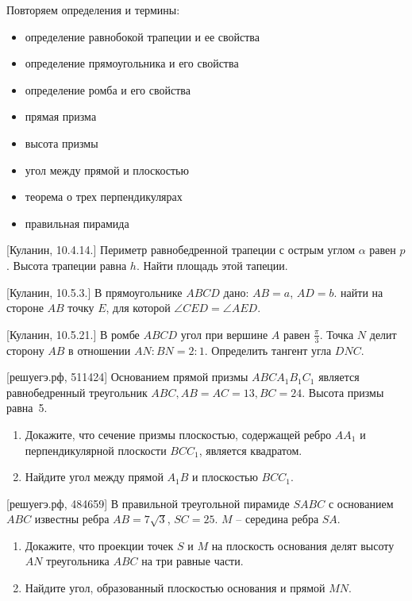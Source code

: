 \documentclass[geometry,a5paper]{pum}
\date{26.03.20}
\begin{document}
Повторяем определения и термины:
\begin{itemize}
  \item определение равнобокой трапеции и ее свойства
  \item определение прямоугольника и его свойства
  \item определение ромба и его свойства
  \item прямая призма
  \item высота призмы
  \item угол между прямой и плоскостью
  \item теорема о трех перпендикулярах
  \item правильная пирамида
\end{itemize}


\begin{exercises}
  \begin{question}
    \textcolor{darkcolortheme}{[Куланин, 10.4.14.]}
    Периметр равнобедренной трапеции с острым углом $\alpha$ равен $p$. Высота трапеции равна $h$. Найти площадь этой тапеции.
  \end{question}
  \begin{question}
    \textcolor{darkcolortheme}{[Куланин, 10.5.3.]}
    В прямоугольнике $ABCD$ дано: $AB=a$, $AD=b$. найти на стороне $AB$ точку $E$, для которой $\angle CED=\angle AED$.
  \end{question}
  \begin{question}
    \textcolor{darkcolortheme}{[Куланин, 10.5.21.]}
    В ромбе $ABCD$ угол при вершине $A$ равен $\frac{\pi}{3}$. Точка $N$ делит сторону $AB$ в отношении $AN:BN=2:1$. Определить тангент угла $DNC$.
  \end{question}
  \begin{question}
    \textcolor{darkcolortheme}{[решуегэ.рф, 511424]}
    Основанием прямой призмы $ABCA_1B_1C_1$ является равнобедренный треугольник  $ABC, AB=AC=13, BC=24$. Высота призмы равна~5.
    \begin{enumerate}[nosep,label=\asbuk*), ref=\asbuk*]
    \item Докажите, что сечение призмы плоскостью, содержащей ребро $AA_1$ и перпендикулярной плоскости $BCC_1$, является квадратом.
    \item Найдите угол между прямой $A_1B$ и плоскостью $BCC_1$.  
  \end{enumerate}
\end{question}
  \begin{question}
    \textcolor{darkcolortheme}{[решуегэ.рф, 484659]}
    В правильной треугольной пирамиде $SABC$ с основанием $ABC$ известны ребра $AB=7\sqrt{3}$, $SC = 25$. $M$ -- середина ребра $SA$.
    \begin{enumerate}[nosep,label=\asbuk*), ref=\asbuk*]
    \item Докажите, что проекции точек $S$ и $M$ на плоскость основания делят высоту $AN$ треугольника $ABC$ на три равные части.
    \item Найдите угол, образованный плоскостью основания и прямой $MN$.
  \end{enumerate}
\end{question}


\end{exercises}
\end{document}
